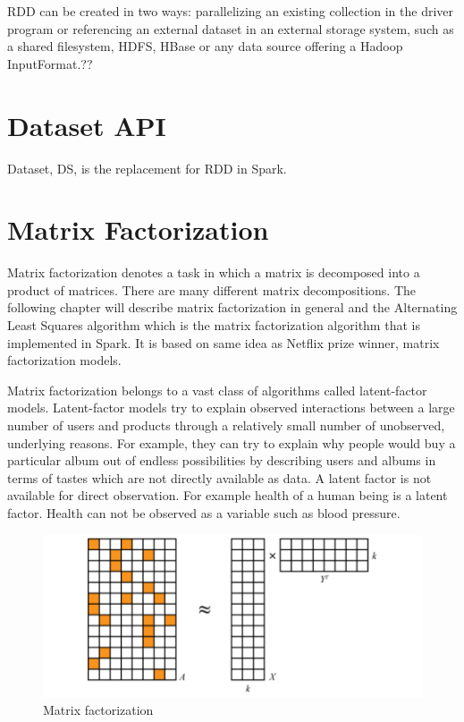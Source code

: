 \documentclass[12pt,a4paper,english
]{tutthesis}
\begin{document}
RDD can be created in two ways: parallelizing an existing collection in the driver program or referencing an external dataset in an external storage system, such as a shared filesystem, HDFS, HBase or any data source offering a Hadoop InputFormat.?? \cite{spark-programming-guide}

\section{Dataset API}

Dataset, DS, is the replacement for RDD in Spark.

\section{Matrix Factorization}

Matrix factorization denotes a task in which a matrix is decomposed into a product of matrices. There are many different matrix decompositions. The following chapter will describe matrix factorization in general and the Alternating Least Squares algorithm which is the matrix factorization algorithm that is implemented in Spark. It is based on same idea as Netflix prize winner, matrix factorization models.

Matrix factorization belongs to a vast class of algorithms called latent-factor
models. Latent-factor models try to explain observed interactions between a large number of users and products through a relatively small number of unobserved, underlying reasons. For example, they can try to explain why people would buy a particular album out of endless possibilities by describing users and albums in terms of tastes which are not directly available as data. \cite{ryza15} A latent factor is not available for direct observation. For example health of a human being is a latent factor. Health can not be observed as a variable such as blood pressure.

\begin{figure}[h]
	\caption{Matrix factorization \cite{ryza15}}
	\centering
	\includegraphics[scale=0.8]{matrix_factorization}
\end{figure}
\end{document}
